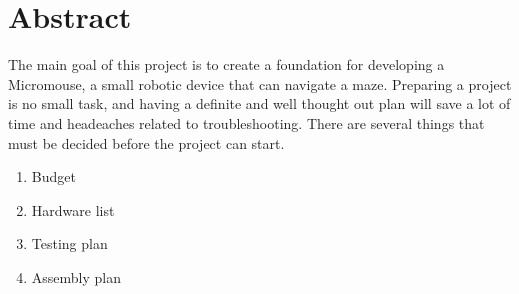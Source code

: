 \section*{Abstract}
The main goal of this project is to create a foundation for developing a Micromouse, a small robotic device that can navigate a maze. Preparing 
a project is no small task, and having a definite and well thought out plan will save a lot of time and headeaches related to troubleshooting. There are several things that
must be decided before the project can start.



\begin{enumerate}
    \item Budget
    \item Hardware list
    \item Testing plan
    \item Assembly plan
\end{enumerate}